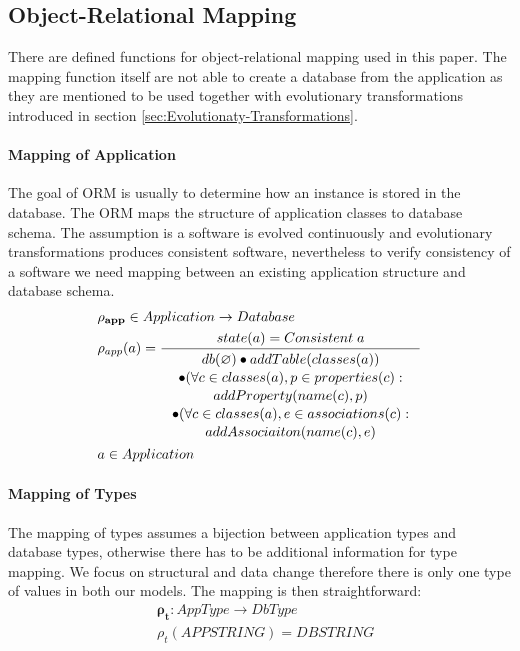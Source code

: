 \documentclass[11pt]{article}
\begin{document}
\subsection{Object-Relational Mapping}
\label{sec:orm}
There are defined functions for object-relational mapping used in this paper. The mapping function itself are not able to create a database from the application as they are mentioned to be used together with evolutionary transformations introduced in section \ref{sec:Evolutionaty-Transformations}.

\paragraph{Mapping of Application} The goal of ORM is usually to determine how an instance is stored in the database. The ORM maps the structure of application classes to database schema. The assumption is a software is evolved continuously and evolutionary transformations produces consistent software, nevertheless to verify consistency of a software we need mapping between an existing application structure and database schema. 
\begin{align*}
&	\mathbf{\rho_{app}} \in Application \rightarrow Database\\
&	\rho_{app}(a) = \inference{state(a) = Consistent \; a}{\begin{gathered}
   db(\varnothing) \bullet addTable(classes(a)) \\ 
	\bullet (\forall c \in classes(a), p \in properties(c) : \\ addProperty(name(c), p) \\
	\bullet (\forall c \in classes(a), e \in associations(c) : \\ addAssociaiton(name(c), e) 
\end{gathered}}\\
& a \in Application
\end{align*}


\paragraph{Mapping of Types} The mapping of types assumes a bijection between application types and database types, otherwise there has to be additional information for type mapping. We focus on structural and data change therefore there is only one type of values in both our models. The mapping is then straightforward:
\begin{align*}
&	\mathbf{\rho_{t}} : AppType \rightarrow DbType  \\
& 	\rho_{t}(APPSTRING) = DBSTRING 
\end{align*}
\end{document}
